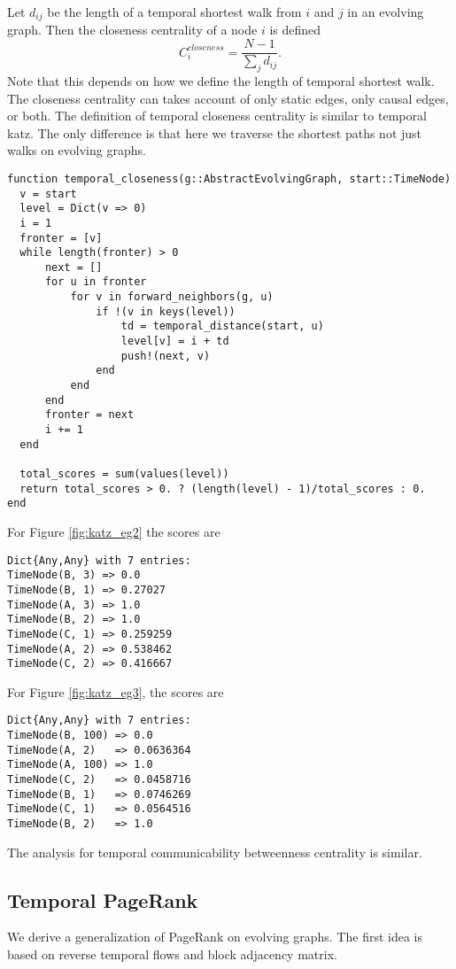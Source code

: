 \documentclass[12pt]{article}
\theoremstyle{definition}
\begin{document}
Let $d_{ij}$ be the length of a temporal shortest walk from $i$ and $j$ in an evolving graph. Then
the closeness centrality of a node $i$ is defined
$$
C_i^{closeness} = \frac{N-1}{\sum_j d_{ij}}.
$$
Note that this depends on how we define the length of temporal shortest walk. The closeness centrality can takes account of only static edges, only causal edges, or both.
The definition of temporal closeness centrality is similar to temporal katz. The only difference is that here we traverse the shortest paths not just walks on evolving graphs.

\begin{lstlisting}
function temporal_closeness(g::AbstractEvolvingGraph, start::TimeNode)
  v = start
  level = Dict(v => 0)
  i = 1
  fronter = [v]
  while length(fronter) > 0
      next = []
      for u in fronter
          for v in forward_neighbors(g, u)
              if !(v in keys(level))
                  td = temporal_distance(start, u)
                  level[v] = i + td
                  push!(next, v)
              end
          end
      end
      fronter = next
      i += 1
  end

  total_scores = sum(values(level))
  return total_scores > 0. ? (length(level) - 1)/total_scores : 0.
end
\end{lstlisting}
For Figure \ref{fig:katz_eg2} the scores are
\begin{lstlisting}
Dict{Any,Any} with 7 entries:
TimeNode(B, 3) => 0.0
TimeNode(B, 1) => 0.27027
TimeNode(A, 3) => 1.0
TimeNode(B, 2) => 1.0
TimeNode(C, 1) => 0.259259
TimeNode(A, 2) => 0.538462
TimeNode(C, 2) => 0.416667
\end{lstlisting}
For Figure \ref{fig:katz_eg3}, the scores are
\begin{lstlisting}
Dict{Any,Any} with 7 entries:
TimeNode(B, 100) => 0.0
TimeNode(A, 2)   => 0.0636364
TimeNode(A, 100) => 1.0
TimeNode(C, 2)   => 0.0458716
TimeNode(B, 1)   => 0.0746269
TimeNode(C, 1)   => 0.0564516
TimeNode(B, 2)   => 1.0
\end{lstlisting}


The analysis for temporal communicability betweenness centrality is similar.

\subsection{Temporal PageRank}

We derive a generalization of PageRank on evolving graphs.
The first idea is based on reverse temporal flows and block adjacency matrix.
\end{document}
